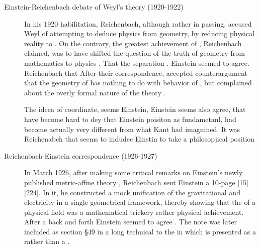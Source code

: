 \documentclass[draft]{article}
\newcommand{\PRZL}{\citetitle{Reichenbach1928}\xspace}
\begin{document}
\begin{description}
\item[Einstein-Reichenbach debate of Weyl's theory (1920-1922)]\label{reichenbachweyl} In his 1920 habilitation, Reichenbach, although rather in passing, accused Weyl of attempting to deduce physics from geometry, by reducing physical reality to  \citep[73]{Reichenbach1920a}. On the contrary, the greatest achievement of \gr, Reichenbach claimed, was to have shifted the question of the truth of geometry from mathematics to physics \citep[73]{Reichenbach1920a}. That the separation . Einstein seemed to agree. Reichenbach  that After their correspondence, \citet[367--368]{Reichenbach1921}  accepted  counterargument that the geometry of \spti has nothing to do with behavior of \rac, but complained about the overly formal nature of the theory \citep[367]{Reichenbach1921}.



The ideea of coordinate, seems Einstein, Einstein seems also agree, that have become hard to dey that Einstein poisiton as  fundametanl, had become actually very different from what Kant had imagnined. It was Reichenabch that seems to indudec Einstin to take a philosopjical position


\item[Reichenbach-Einstein correspondence (1926-1927)]\label{reichenbacheinsteinI} 
In March 1926, after making some critical remarks on Einstein's newly published metric-affine theory \citep{Einstein1925a}, Reichenbach sent Einstein a 10-page  [15][224]. In it, he constructed a mock unification of the gravitational and electricity in a single geometrical framework, thereby showing that the  of a physical field was a mathematical trickery rather physical achievement. After a back and forth Einstein seemed to agree \citep{Lehmkuhl2014}. The note was later included as section \S49 in a long technical \Ap to the \PRZL \citep[-50]{Reichenbach1928} in which  \gr is presented as a  rather than a  \citep{Giovanelli2020}. 


\end{description}
\end{document}
